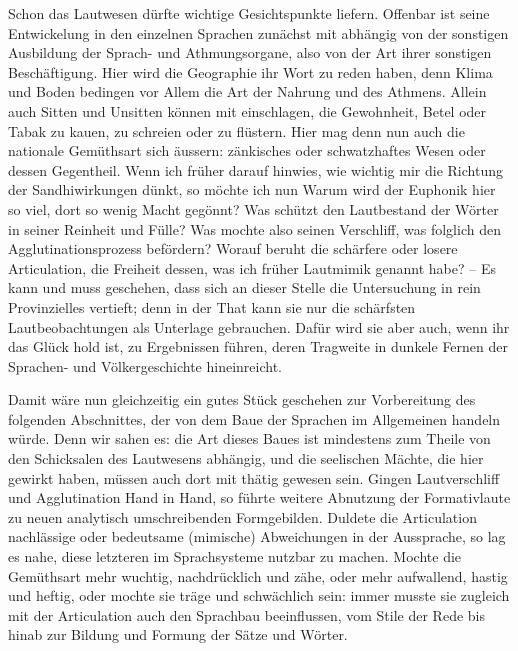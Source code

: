 Schon das Lautwesen dürfte wichtige Gesichtspunkte liefern. Offenbar ist seine Entwickelung in den einzelnen Sprachen zunächst mit abhängig von der sonstigen Ausbildung der Sprach- und Athmungsorgane, also von der Art ihrer sonstigen Beschäftigung. Hier wird die Geographie ihr Wort zu reden haben, denn Klima und Boden bedingen vor Allem die Art der Nahrung und des Athmens. Allein auch Sitten und Unsitten können mit einschlagen, die Gewohnheit, Betel oder Tabak zu kauen, zu schreien oder zu flüstern. Hier mag denn nun auch die nationale Gemüthsart sich äussern: zänkisches oder schwatzhaftes Wesen oder dessen Gegentheil. Wenn ich früher darauf hinwies, wie wichtig mir die Richtung der Sandhiwirkungen dünkt, so möchte ich nun  Warum wird der Euphonik hier so viel, dort so wenig Macht gegönnt? \label{sp.480} Was schützt den Lautbestand der Wörter in seiner Reinheit und Fülle? Was mochte also seinen Verschliff, was folglich den Agglutinationsprozess befördern? Worauf beruht die schärfere oder losere Articulation, die Freiheit dessen, was ich früher Lautmimik genannt habe? – Es kann und muss geschehen, dass sich an dieser Stelle die Untersuchung in rein Provinzielles vertieft; denn in der That kann sie nur die schärfsten Lautbeobachtungen als Unterlage gebrauchen. Dafür wird sie aber auch, wenn ihr das Glück hold ist, zu Ergebnissen führen, deren Tragweite in dunkele Fernen der Sprachen- und Völkergeschichte hineinreicht.

Damit wäre nun gleichzeitig ein gutes Stück geschehen zur Vorbereitung des folgenden Abschnittes, der von dem Baue der Sprachen im Allgemeinen handeln würde. Denn wir sahen es: die Art dieses Baues ist mindestens zum Theile von den Schicksalen des Lautwesens abhängig, und die seelischen Mächte, die hier gewirkt haben, müssen \label{fp.461} auch dort mit thätig gewesen sein. Gingen Lautverschliff und Agglutination Hand in Hand, so führte weitere Abnutzung der Formativlaute zu neuen analytisch umschreibenden Formgebilden. Duldete die Articulation nachlässige oder bedeutsame (mimische) Abweichungen in der Aussprache, so lag es nahe, diese letzteren im Sprachsysteme nutzbar zu machen. Mochte die Gemüthsart mehr wuchtig, nachdrücklich und zähe, oder mehr aufwallend, hastig und heftig, oder mochte sie träge und schwächlich sein: immer musste sie zugleich mit der Articulation auch den Sprachbau beeinflussen, vom Stile der Rede bis hinab zur Bildung und Formung der Sätze und Wörter.

